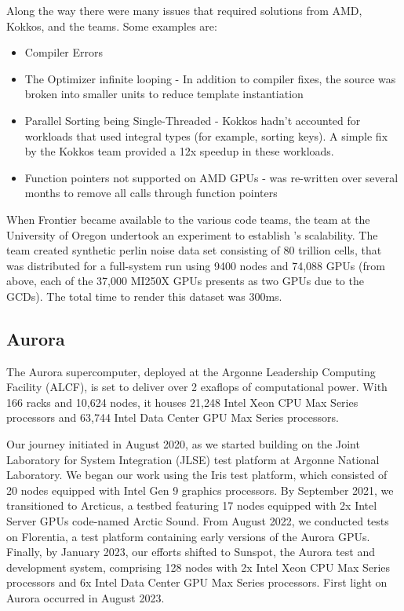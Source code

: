 Along the way there were many issues that required solutions from AMD, Kokkos, and the \vtkm teams. Some examples are:
\begin{itemize}
    \item Compiler Errors
    \item The Optimizer infinite looping - In addition to compiler fixes, the \vtkm source was broken into smaller units to reduce template instantiation
    \item Parallel Sorting being Single-Threaded - Kokkos hadn't accounted for \vtkm workloads that used integral types (for example, sorting keys). A simple fix by the Kokkos team provided a 12x speedup in these workloads.
    \item Function pointers not supported on AMD GPUs - \vtkm was re-written over several months to remove all calls through function pointers
\end{itemize}

When Frontier became available to the various code teams, the \vtkm team at the University of Oregon undertook an experiment to establish \vtkm's scalability. The team created synthetic perlin noise data set consisting of 80 trillion cells, that was distributed for a full-system run using 9400 nodes and 74,088 GPUs (from above, each of the 37,000 MI250X GPUs presents as two GPUs due to the GCDs). The total time to render this dataset was 300ms.


\subsection{Aurora}


The Aurora supercomputer, deployed at the Argonne Leadership Computing Facility (ALCF), is set to deliver over 2 exaflops of computational power. With 166 racks and 10,624 nodes, it houses 21,248 Intel Xeon CPU Max Series processors and 63,744 Intel Data Center GPU Max Series processors.

Our journey initiated in August 2020, as we started building \vtkm on the Joint Laboratory for System Integration (JLSE) test platform at Argonne National Laboratory. We began our work using the Iris test platform, which consisted of 20 nodes equipped with Intel Gen 9 graphics processors. By September 2021, we transitioned to Arcticus, a testbed featuring 17 nodes equipped with 2x Intel Server GPUs code-named Arctic Sound. From August 2022, we conducted tests on Florentia, a test platform containing early versions of the Aurora GPUs. Finally, by January 2023, our efforts shifted to Sunspot, the Aurora test and development system, comprising 128 nodes with 2x Intel Xeon CPU Max Series processors and 6x Intel Data Center GPU Max Series processors. First light on Aurora occurred in August 2023.

